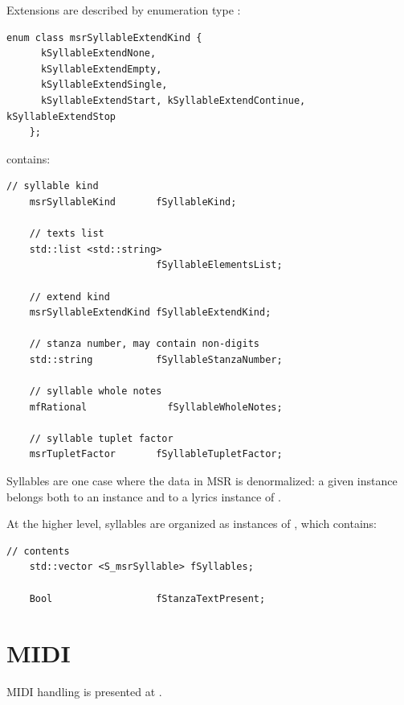 Extensions are described by enumeration type {\tt }:
\begin{lstlisting}[language=CPlusPlus]
    enum class msrSyllableExtendKind {
      kSyllableExtendNone,
      kSyllableExtendEmpty,
      kSyllableExtendSingle,
      kSyllableExtendStart, kSyllableExtendContinue, kSyllableExtendStop
    };
\end{lstlisting}

 contains:
\begin{lstlisting}[language=CPlusPlus]
    // syllable kind
    msrSyllableKind       fSyllableKind;

    // texts list
    std::list <std::string>
                          fSyllableElementsList;

    // extend kind
    msrSyllableExtendKind fSyllableExtendKind;

    // stanza number, may contain non-digits
    std::string           fSyllableStanzaNumber;

    // syllable whole notes
    mfRational              fSyllableWholeNotes;

    // syllable tuplet factor
    msrTupletFactor       fSyllableTupletFactor;
\end{lstlisting}

Syllables are one case where the data in MSR is denormalized: a given  instance belongs both to an  instance and to a lyrics instance of .

At the higher level, syllables are organized as instances of , which contains:
\begin{lstlisting}[language=CPlusPlus]
    // contents
    std::vector <S_msrSyllable> fSyllables;

    Bool                  fStanzaTextPresent;
\end{lstlisting}


\section{MIDI}\label{MIDI}

MIDI handling is presented at .
